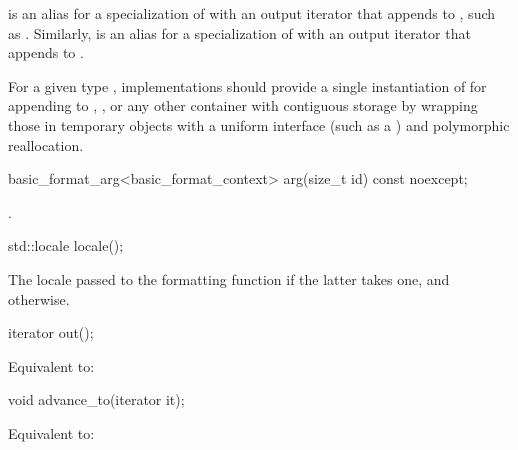 \pnum
{}%
 is an alias for
a specialization of 
with an output iterator
that appends to ,
such as .
%
Similarly,  is an alias for
a specialization of 
with an output iterator
that appends to .

\pnum
\recommended
For a given type ,
implementations should provide
a single instantiation of 
for appending to
,
,
or any other container with contiguous storage
by wrapping those in temporary objects with a uniform interface
(such as a ) and polymorphic reallocation.

%
\begin{itemdecl}
basic_format_arg<basic_format_context> arg(size_t id) const noexcept;
\end{itemdecl}

\begin{itemdescr}
\pnum
\returns
{}.
\end{itemdescr}

%
\begin{itemdecl}
std::locale locale();
\end{itemdecl}

\begin{itemdescr}
\pnum
\returns
The locale passed to the formatting function
if the latter takes one,
and  otherwise.
\end{itemdescr}

%
\begin{itemdecl}
iterator out();
\end{itemdecl}

\begin{itemdescr}
\pnum
\effects
Equivalent to: 
\end{itemdescr}

%
\begin{itemdecl}
void advance_to(iterator it);
\end{itemdecl}

\begin{itemdescr}
\pnum
\effects
Equivalent to: 
\end{itemdescr}

